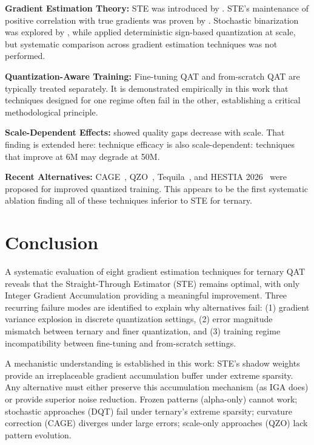 \documentclass{article}
\begin{document}
\textbf{Gradient Estimation Theory:} STE was introduced by \citet{bengio2013estimating}. STE's maintenance of positive correlation with true gradients was proven by \citet{yin2019understanding}. Stochastic binarization was explored by \citet{courbariaux2015binaryconnect}, while \citet{hubara2016binarized} applied deterministic sign-based quantization at scale, but systematic comparison across gradient estimation techniques was not performed.

\textbf{Quantization-Aware Training:} Fine-tuning QAT and from-scratch QAT are typically treated separately. It is demonstrated empirically in this work that techniques designed for one regime often fail in the other, establishing a critical methodological principle.

\textbf{Scale-Dependent Effects:} \citet{ma2024era} showed quality gaps decrease with scale. That finding is extended here: technique efficacy is also scale-dependent: techniques that improve at 6M may degrade at 50M.

\textbf{Recent Alternatives:} CAGE~\citep{cage2025}, QZO~\citep{qzo2025}, Tequila~\citep{tequila2025}, and HESTIA 2026~\citep{hestia2026} were proposed for improved quantized training. This appears to be the first systematic ablation finding all of these techniques inferior to STE for ternary.

\section{Conclusion}

A systematic evaluation of eight gradient estimation techniques for ternary QAT reveals that the Straight-Through Estimator (STE) remains optimal, with only Integer Gradient Accumulation providing a meaningful improvement. Three recurring failure modes are identified to explain why alternatives fail: (1) gradient variance explosion in discrete quantization settings, (2) error magnitude mismatch between ternary and finer quantization, and (3) training regime incompatibility between fine-tuning and from-scratch settings.

A mechanistic understanding is established in this work: STE's shadow weights provide an irreplaceable gradient accumulation buffer under extreme sparsity. Any alternative must either preserve this accumulation mechanism (as IGA does) or provide superior noise reduction. Frozen patterns (alpha-only) cannot work; stochastic approaches (DQT) fail under ternary's extreme sparsity; curvature correction (CAGE) diverges under large errors; scale-only approaches (QZO) lack pattern evolution.
\end{document}
